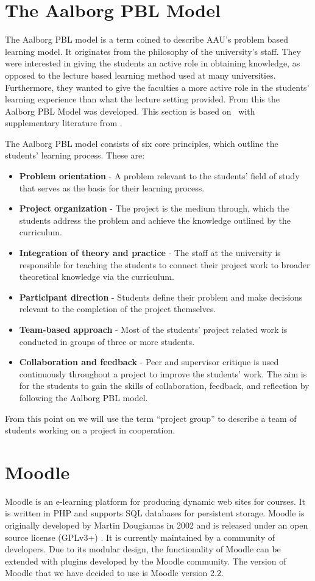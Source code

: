 \section{The Aalborg PBL Model}
\label{sub:aaupbl}
The Aalborg PBL model is a term coined to describe AAU's problem based learning model. 
It originates from the philosophy of the university's staff. 
They were interested in giving the students an active role in obtaining knowledge, as opposed to the lecture based learning method used at many universities.
Furthermore, they wanted to give the faculties a more active role in the students' learning experience than what the lecture setting provided. 
From this the Aalborg PBL Model was developed. 
This section is based on~\citep{Barge10} with supplementary literature from \cite[pp.~9-16]{theaalborgpblmodel2004}.

The Aalborg PBL model consists of six core principles, which outline the students' learning process. 
These are:
\begin{itemize}
	\item \textbf{Problem orientation} - A problem relevant to the students' field of study that serves as the basis for their learning process.
	\item \textbf{Project organization} - The project is the medium through, which the students address the problem and achieve the knowledge outlined by the curriculum.
	\item \textbf{Integration of theory and practice} - The staff at the university is responsible for teaching the students to connect their project work to broader theoretical knowledge via the curriculum.
	\item \textbf{Participant direction} - Students define their problem and make decisions relevant to the completion of the project themselves.
	\item \textbf{Team-based approach} - Most of the students' project related work is conducted in groups of three or more students.
	\item \textbf{Collaboration and feedback} - Peer and supervisor critique is used continuously throughout a project to improve the students' work.
	The aim is for the students to gain the skills of collaboration, feedback, and reflection by following the Aalborg PBL model. 
\end{itemize}
From this point on we will use the term ``project group'' to describe a team of students working on a project in cooperation.


\section{Moodle}
\label{sec:Moodle}
Moodle is an e-learning platform for producing dynamic web sites for courses. 
It is written in PHP and supports SQL databases for persistent storage.
Moodle is originally developed by Martin Dougiamas in 2002 and is released under an open source license (GPLv3+) \citep{gpl}\cite{moodlelicense}. 
It is currently maintained by a community of developers. 
Due to its modular design, the functionality of Moodle can be extended with plugins developed by the Moodle community.
The version of Moodle that we have decided to use is Moodle version 2.2.

